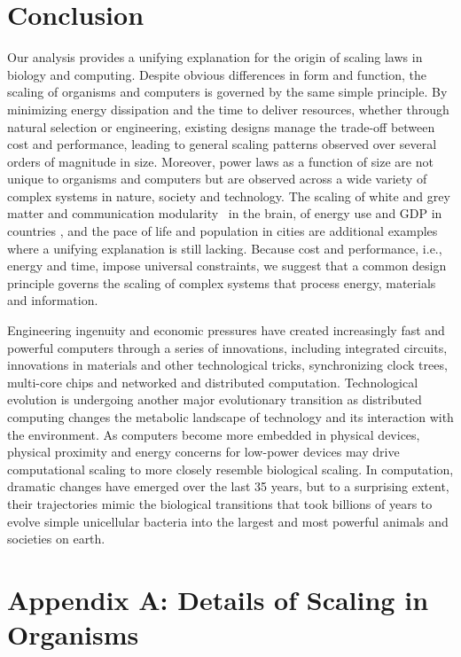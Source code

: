 \documentclass[12pt]{article}
\begin{document}
\section{Conclusion}

Our analysis provides a unifying explanation for the origin of scaling laws in
biology and computing. Despite obvious differences in form and function, the
scaling of organisms and computers is governed by the same simple principle.
By minimizing energy dissipation and the time to deliver resources, whether through natural selection or
engineering, existing designs manage the trade-off between cost and
performance, leading to general scaling patterns observed over several orders
of magnitude in size.  Moreover, power laws as a function of size are not
unique to organisms and computers but are observed across a wide
variety of complex systems in nature, society and technology.  The scaling of
white and grey matter\cite{zhang00} and communication modularity~\cite{meunier2010modular} in the brain, of energy use and GDP in
countries \cite{brown11}, and the pace of life and population in cities
\cite{bettencourt07} are additional examples where a unifying explanation is
still lacking.  Because cost and performance, i.e., energy and time, impose
universal constraints, we suggest that a common design principle governs the
scaling of complex systems that process energy, materials and information.

Engineering ingenuity and economic pressures have created increasingly
fast and powerful computers through a series of innovations, including
integrated circuits, innovations in materials and other technological
tricks, synchronizing clock trees, multi-core chips and networked and
distributed computation. Technological evolution is undergoing another
major evolutionary transition as distributed computing changes the
metabolic landscape of technology and its interaction with the
environment. As computers become more embedded in physical devices,
physical proximity and energy concerns for low-power devices may drive
computational scaling to more closely resemble biological scaling. In
computation, dramatic changes have emerged over the last 35 years, but
to a surprising extent, their trajectories mimic the biological
transitions that took billions of years to evolve simple unicellular
bacteria into the largest and most powerful animals and societies on
earth.




\section{Appendix A: Details of Scaling in Organisms}
\label{sec:AppendixOrg}
\end{document}
